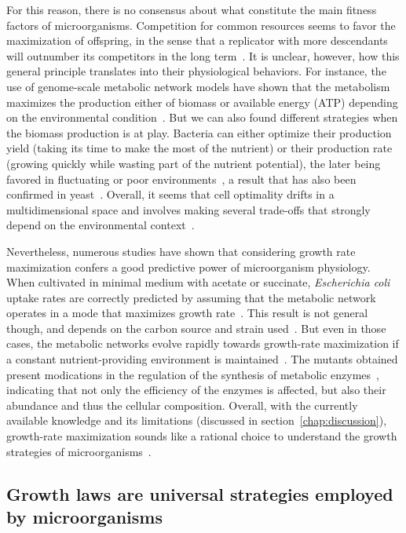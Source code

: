 For this reason, there is no consensus about what constitute the main fitness factors of microorganisms.
Competition for common resources seems to favor the maximization of offspring, in the sense that a replicator with more descendants will outnumber its competitors in the long term~\cite{dawkins_selfish_1976}.
It is unclear, however, how this general principle translates into their physiological behaviors.
For instance, the use of genome-scale metabolic network models have shown that the metabolism maximizes the production either of biomass or available energy (ATP) depending on the environmental condition~\cite{schuetz_systematic_2007}.
But we can also found different strategies when the biomass production is at play.
Bacteria can either optimize their production yield (taking its time to make the most of the nutrient) or their production rate (growing quickly while wasting part of the nutrient potential), the later being favored in fluctuating or poor environments~\cite{frank_tradeoff_2010,maclean_tragedy_2008}, a result that has also been confirmed in yeast~\cite{schuster_maximization_2008}.
Overall, it seems that cell optimality drifts in a multidimensional space and involves making several trade-offs that strongly depend on the environmental context~\cite{schuetz_multidimensional_2012}.

Nevertheless, numerous studies have shown that considering growth rate maximization confers a good predictive power of microorganism physiology.
When cultivated in minimal medium with acetate or succinate, \textit{Escherichia coli} uptake rates are correctly predicted by assuming that the metabolic network operates in a mode that maximizes growth rate~\cite{edwards_silico_2001}.
This result is not general though, and depends on the carbon source and strain used~\cite{ibarra_escherichia_2002}.
But even in those cases, the metabolic networks evolve rapidly towards growth-rate maximization if a constant nutrient-providing environment is maintained~\cite{ibarra_escherichia_2002}.
The mutants obtained present modications in the regulation of the synthesis of metabolic enzymes~\cite{lewis_omic_2010}, indicating that not only the efficiency of the enzymes is affected, but also their abundance and thus the cellular composition.
Overall, with the currently available knowledge and its limitations (discussed in section~\ref{chap:discussion}), growth-rate maximization sounds like a rational choice to understand the growth strategies of microorganisms~\cite{molenaar_shifts_2009}.

\subsection{Growth laws are universal strategies employed by microorganisms}


